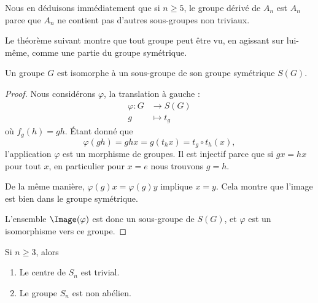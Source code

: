 Nous en déduisons immédiatement que si \( n\geq 5\), le groupe dérivé de \( A_n\) est \( A_n\) parce que \( A_n\) ne contient pas d'autres sous-groupes non triviaux.

Le théorème suivant montre que tout groupe peut être vu, en agissant sur lui-même, comme une partie du groupe symétrique.
\begin{theorem}
    Un groupe \( G\) est isomorphe à un sous-groupe de son groupe symétrique \( S(G)\).
\end{theorem}

\begin{proof}
    Nous considérons \( \varphi\), la translation à gauche :
    \begin{equation}
        \begin{aligned}
            \varphi\colon G&\to S(G) \\
            g&\mapsto t_g 
        \end{aligned}
    \end{equation}
    où \( f_g(h)=gh\). Étant donné que
    \begin{equation}
        \varphi(gh)= ghx=g(t_hx)=t_g\circ t_h(x),
    \end{equation}
    l'application \( \varphi\) est un morphisme de groupes. Il est injectif parce que si \( gx=hx\) pour tout \( x\), en particulier pour \( x=e\) nous trouvons \( g=h\). 
    
    De la même manière, \( \varphi(g)x=\varphi(g)y\) implique \( x=y\). Cela montre que l'image est bien dans le groupe symétrique.

    L'ensemble \( \Image(\varphi)\) est donc un sous-groupe de \( S(G)\), et \( \varphi\) est un isomorphisme vers ce groupe.
\end{proof}

\begin{lemma}       \label{LEMooMVUGooRiDaDz}
    Si \( n\geq 3\), alors
    \begin{enumerate}
        \item
            Le centre de \( S_n\) est trivial.
        \item
            Le groupe \( S_n\) est non abélien.
    \end{enumerate}
\end{lemma}

